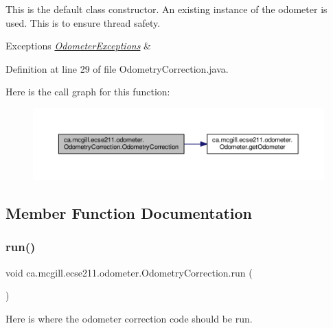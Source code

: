This is the default class constructor. An existing instance of the odometer is used. This is to ensure thread safety.


\begin{DoxyExceptions}{Exceptions}
{\em \hyperlink{classca_1_1mcgill_1_1ecse211_1_1odometer_1_1_odometer_exceptions}{Odometer\+Exceptions}} & \\
\hline
\end{DoxyExceptions}


Definition at line 29 of file Odometry\+Correction.\+java.

Here is the call graph for this function\+:
\nopagebreak
\begin{figure}[H]
\begin{center}
\leavevmode
\includegraphics[width=350pt]{classca_1_1mcgill_1_1ecse211_1_1odometer_1_1_odometry_correction_ad80b45e0bc4bf935494e075edcec739c_cgraph}
\end{center}
\end{figure}


\subsection{Member Function Documentation}
\mbox{\label{classca_1_1mcgill_1_1ecse211_1_1odometer_1_1_odometry_correction_aad66a7030ac00f3a9cbe7bc33c25acbf}} 
\subsubsection{\texorpdfstring{run()}{run()}}
{\footnotesize\ttfamily void ca.\+mcgill.\+ecse211.\+odometer.\+Odometry\+Correction.\+run (\begin{DoxyParamCaption}{ }\end{DoxyParamCaption})}

Here is where the odometer correction code should be run.


